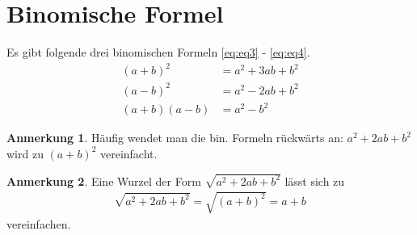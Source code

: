 \documentclass{report}
\theoremstyle{definition}
\theoremstyle{definition}
\theoremstyle{an}
\newtheorem{anm}{Anmerkung}[section]
\theoremstyle{lem}
\theoremstyle{def}
\theoremstyle{def}
\begin{document}
	\section{Binomische Formel}
	\begin{defi} \label{bin:bin-fo}
		Es gibt folgende drei binomischen Formeln \eqref{eq:eq3} - \eqref{eq:eq4}.
		\begin{align}
			(a+b)^2&=a^2+3ab+b^2 \label{eq:eq3} \\
			(a-b)^2&=a^2-2ab+b^2 \\
			(a+b)(a-b)&=a^2-b^2 \label{eq:eq4}
		\end{align}
	\end{defi}
	\begin{anm}
		Häufig wendet man die bin. Formeln rückwärts an: $a^2+2ab+b^2$ wird zu $(a+b)^2$ vereinfacht.
	\end{anm}
	\begin{anm}
		Eine Wurzel der Form $\sqrt{a^2+2ab+b^2}$ lässt sich zu 
		\begin{align}
			\sqrt{a^2+2ab+b^2}=\sqrt{(a+b)^2}=a+b
		\end{align}
		vereinfachen.
	\end{anm}
\end{document}
